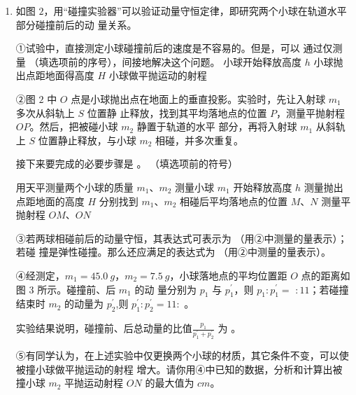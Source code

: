 \begin{enumerate}
\renewcommand{\labelenumi}{\arabic{enumi}.}
\item
{}
如图 $ 2 $，用“碰撞实验器”可以验证动量守恒定律，即研究两个小球在轨道水平部分碰撞前后的动
量关系。
\begin{figure}[h!]
\centering

\end{figure}

①试验中，直接测定小球碰撞前后的速度是不容易的。但是，可以
通过仅测量
（填选项前的序号），间接地解决这个问题。
\threechoices
{小球开始释放高度 $ h $}
{小球抛出点距地面得高度 $ H $}
{小球做平抛运动的射程}



②图 $ 2 $ 中 $ O $ 点是小球抛出点在地面上的垂直投影。实验时，先让入射球 $ m_{1} $ 多次从斜轨上 $ S $ 位置静
止释放，找到其平均落地点的位置 $ P $，测量平抛射程 $ OP $。然后，把被碰小球 $ m_{2} $ 静置于轨道的水平
部分，再将入射球 $ m_{1} $ 从斜轨上 $ S $ 位置静止释放，与小球 $ m_{2} $ 相碰，并多次重复。

接下来要完成的必要步骤是
。
（填选项前的符号）

\fivechoices
{用天平测量两个小球的质量 $ m_{1} $、$ m_{2} $}
{测量小球 $ m_{1} $ 开始释放高度 $ h $}
{测量抛出点距地面的高度 $ H $}
{分别找到 $ m_{1} $、$ m_{2} $ 相碰后平均落地点的位置 $ M $、$ N $}
{测量平抛射程 $ OM $、$ ON $}


③若两球相碰前后的动量守恒，其表达式可表示为  （用②中测量的量表示）；若碰
撞是弹性碰撞。那么还应满足的表达式为
（用②中测量的量表示）。

④经测定，$ m_{1} =45.0 \ g $，$ m_{2} =7.5 \ g $，小球落地点的平均位置距 $ O $ 点的距离如图 $ 3 $ 所示。碰撞前、后 $ m_{1} $ 的动
量分别为 $ p_{1} $ 与 $ p_1 ^{\prime} $，则 $ p_1:p_1 ^{\prime} = $
$ :11 $；若碰撞结束时 $ m_{2} $ 的动量为 $ p_2 ^{\prime} $,则 $ p_1 ^{\prime} :p_2 ^{\prime} =11: $  。

实验结果说明，碰撞前、后总动量的比值$\frac{p_{1}}{p_{1}^{\prime}+p_{2}^{\prime}}$
为  。
\begin{figure}[h!]
\centering

\end{figure}


⑤有同学认为，在上述实验中仅更换两个小球的材质，其它条件不变，可以使被撞小球做平抛运动的射程
增大。请你用④中已知的数据，分析和计算出被撞小球 $ m_{2} $ 平抛运动射程 $ ON $ 的最大值为  $ cm $。









\end{enumerate}

